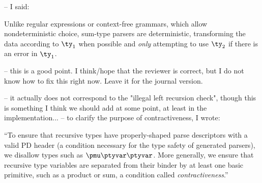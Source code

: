 -- I said:

Unlike regular expressions or
context-free grammars, which allow nondeterministic choice,
sum-type parsers
are deterministic, transforming the data according to $\ty_1$
when possible and {\it only} attempting to
use $\ty_2$ if there is an error in $\ty_1$.


-- this is a good point.  I think/hope that the reviewer is correct,
but I do not know how to fix this right now.  Leave it for the
journal version.



-- it actually does not correspond to the "illegal left recursion check",
though this is something I think we should add at some point, at
least in the implementation...
-- to clarify the purpose of contractiveness, I wrote:

``To ensure that recursive types have properly-shaped parse descriptors
with a valid PD header (a condition necessary for the type safety of
generated parsers), we disallow types such as $\pmu \ptyvar
\ptyvar$. More generally, we ensure that
recursive type variables are separated from their binder by at least
one basic primitive, such as a product or sum, a condition called {\it contractiveness}.''

